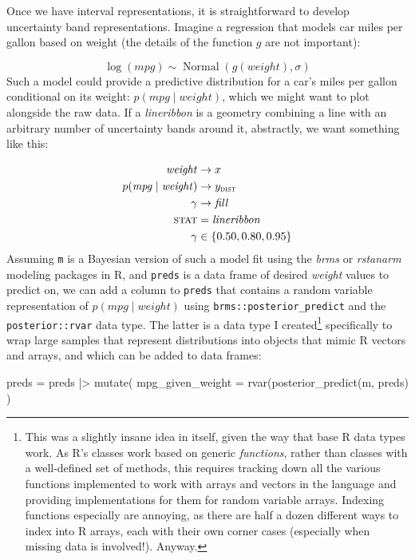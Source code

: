 \documentclass[journal]{vgtc}                     %
\newenvironment{centerverbatim}{%
  \hfill\break
  \centering
  \varwidth{\linewidth}%
  \verbatim
}{%
  \endverbatim
  \endvarwidth
  \par
  \hfill\break
}
\begin{document}
Once we have interval representations, it is straightforward to develop uncertainty band representations. Imagine a regression that models car miles per gallon based on weight (the details of the function $g$ are not important):

\[
\log(\mathit{mpg}) \sim \operatorname{Normal}\left(g(\mathit{weight}), \sigma\right)
\]
Such a model could provide a predictive distribution for a car's miles per gallon conditional on its weight: $p(\mathit{mpg} \mid \mathit{weight})$, which we might want to plot alongside the raw data. If a \textit{lineribbon} is a geometry combining a line with an arbitrary number of uncertainty bands around it, abstractly, we want something like this:

\begin{align*}
\mathit{weight} &\rightarrow x\\
p(\mathit{mpg} \mid \mathit{weight}) &\rightarrow y_\textsc{dist}\\
\gamma &\rightarrow \mathit{fill}\\
\textsc{stat} &= \mathit{lineribbon}\\
\gamma &\in \{0.50, 0.80, 0.95\}
\end{align*}
Assuming \texttt{m}  is a Bayesian version of such a model fit using the \textit{brms} or \textit{rstanarm} modeling packages in R, and \texttt{preds} is a data frame of desired \textit{weight} values to predict on, we can add a column to \texttt{preds} that contains a random variable representation of $p(\mathit{mpg} \mid \mathit{weight})$ using \texttt{brms::posterior\_predict} and the \texttt{posterior::rvar}  data type. The latter is a data type I created\footnote{This was a slightly insane idea in itself, given the way that base R data types work. As R's classes work based on generic \textit{functions}, rather than classes with a well-defined set of methods, this requires tracking down all the various functions implemented to work with arrays and vectors in the language and providing implementations for them for random variable arrays. Indexing functions especially are annoying, as there are half a dozen different ways to index into R arrays, each with their own corner cases (especially when missing data is involved!). Anyway.} specifically to wrap large samples that represent distributions into objects that mimic R vectors and arrays, and which can be added to data frames:

\begin{centerverbatim}
preds = preds |> mutate(
  mpg_given_weight = rvar(posterior_predict(m, preds)
)
\end{centerverbatim}
\end{document}
